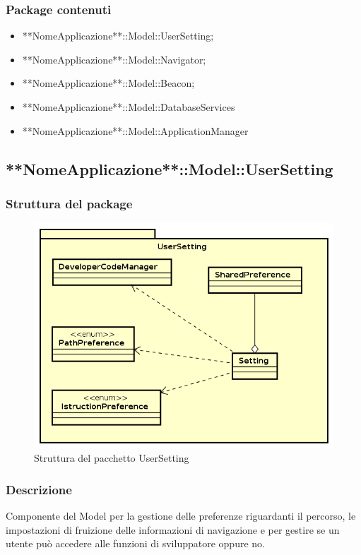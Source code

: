 \documentclass[../SpecificaTecnica.tex]{subfiles}
\begin{document}
		\subsubsection{Package contenuti}
			\begin{itemize}
				\item **NomeApplicazione**::Model::UserSetting;
				\item **NomeApplicazione**::Model::Navigator;
				\item **NomeApplicazione**::Model::Beacon;
				\item **NomeApplicazione**::Model::DatabaseServices
				\item **NomeApplicazione**::Model::ApplicationManager
			\end{itemize}
			\newpage
	\subsection{**NomeApplicazione**::Model::UserSetting}
		\subsubsection{Struttura del package}
			\begin{figure}[!h]
				\centering
				\includegraphics[scale=0.6]{diagrammi/UserSetting.png}
					\caption{Struttura del pacchetto UserSetting}
				\label{fig:Struttura_MVP}
			\end{figure} 
		\subsubsection{Descrizione}
			Componente del Model per la gestione delle preferenze riguardanti il percorso, le impostazioni di fruizione delle informazioni di navigazione e per gestire se un utente può accedere alle funzioni di sviluppatore oppure no.
\end{document}
